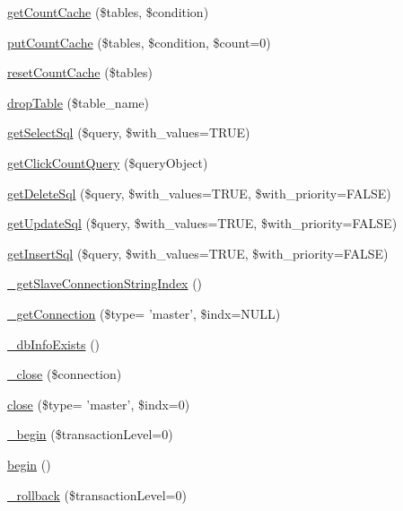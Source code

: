 \begin{DoxyCompactItemize}
\item 
\hyperlink{classDB_af638cf3ae9ad406810b2f8c2d322225c}{get\-Count\-Cache} (\$tables, \$condition)
\item 
\hyperlink{classDB_a90771d4eaa0ff60a1ddbeb338f2ab801}{put\-Count\-Cache} (\$tables, \$condition, \$count=0)
\item 
\hyperlink{classDB_a8167fd227a1955f8300c0d0e70dd9d9e}{reset\-Count\-Cache} (\$tables)
\item 
\hyperlink{classDB_a63a3a5bdc8e30e1cee37cefddd5ce8de}{drop\-Table} (\$table\-\_\-name)
\item 
\hyperlink{classDB_a5324aefa22399846c6a7fb8afeb6e55d}{get\-Select\-Sql} (\$query, \$with\-\_\-values=T\-R\-U\-E)
\item 
\hyperlink{classDB_a75a6b61801ef6ed2bbf092f1333a8ccd}{get\-Click\-Count\-Query} (\$query\-Object)
\item 
\hyperlink{classDB_aeb58bf0e323895cdc7eda34f09254ed6}{get\-Delete\-Sql} (\$query, \$with\-\_\-values=T\-R\-U\-E, \$with\-\_\-priority=F\-A\-L\-S\-E)
\item 
\hyperlink{classDB_ac467d003673def17f4d397e3f25bcf84}{get\-Update\-Sql} (\$query, \$with\-\_\-values=T\-R\-U\-E, \$with\-\_\-priority=F\-A\-L\-S\-E)
\item 
\hyperlink{classDB_a2664c0b5ba2bc70d02504ebf343e913e}{get\-Insert\-Sql} (\$query, \$with\-\_\-values=T\-R\-U\-E, \$with\-\_\-priority=F\-A\-L\-S\-E)
\item 
\hyperlink{classDB_a8dc4e826557c3de0d49adf7e6112bfea}{\-\_\-get\-Slave\-Connection\-String\-Index} ()
\item 
\hyperlink{classDB_a52b496d073cecfd2ca6e14897b559819}{\-\_\-get\-Connection} (\$type= 'master', \$indx=N\-U\-L\-L)
\item 
\hyperlink{classDB_a3bbfb0e7579e8d6fc27a20c1219bb693}{\-\_\-db\-Info\-Exists} ()
\item 
\hyperlink{classDB_a8c161612a558f47fb008dec4b46ee05c}{\-\_\-close} (\$connection)
\item 
\hyperlink{classDB_a99ab404981e46ae5b48e11ce46290500}{close} (\$type= 'master', \$indx=0)
\item 
\hyperlink{classDB_a3f032a017eee272090ea1ae5dba803e3}{\-\_\-begin} (\$transaction\-Level=0)
\item 
\hyperlink{classDB_a41aea6b3a6787467fcfd16d28a302c54}{begin} ()
\item 
\hyperlink{classDB_a5e766ca5cd5fc8dd24795b0846a8b89f}{\-\_\-rollback} (\$transaction\-Level=0)
\item 

\end{DoxyCompactItemize}
